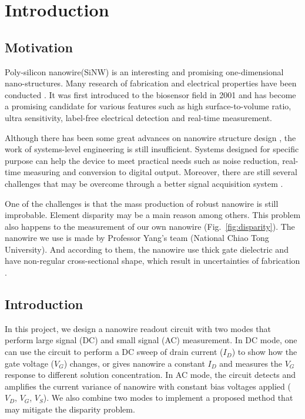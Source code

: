 \chapter{Introduction}
\section{Motivation}
Poly-silicon nanowire(SiNW) is an interesting and promising one-dimensional nano-structures.
Many research of fabrication and electrical properties have been conducted \cite{C25th}.
It was first introduced to the biosensor field in 2001\cite{C2001} and has become a promising candidate for various features such as high surface-to-volume ratio, ultra sensitivity, label-free electrical detection and  real-time measurement.

Although there has been some great advances on nanowire structure design \cite{R1}, the work of systems-level engineering is still insufficient.
Systems designed for specific purpose can help the device to meet practical needs such as noise reduction, real-time measuring and conversion to digital output.
Moreover, there are still several challenges that may be overcome through a better signal acquisition system \cite{R1}.

One of the challenges is that the mass production of robust nanowire is still improbable.
Element disparity may be a main reason among others.
This problem also happens to the measurement of our own nanowire (Fig.~\ref{fig:disparity}).
The nanowire we use is made by Professor Yang's team (National Chiao Tong University).
And according to them, the nanowire use thick gate dielectric and have non-regular cross-sectional shape, which result in uncertainties of fabrication \cite{C6}.


\section{Introduction}
In this project, we design a nanowire readout circuit with two modes that perform large signal (DC) and small signal (AC) measurement.
In DC mode, one can use the circuit to perform a DC sweep of drain current ($I_D$) to show how the gate voltage ($V_{G}$) changes, or gives nanowire a constant $I_D$ and measures the $V_{G}$ response to different solution concentration.
In AC mode, the circuit detects and amplifies the current variance of nanowire with constant bias voltages applied ($V_D$, $V_G$, $V_S$).
We also combine two modes to implement a proposed method that may mitigate the disparity problem.


